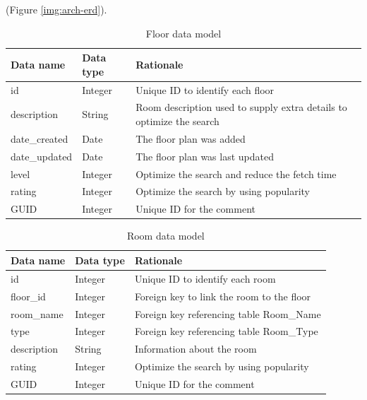 \documentclass{sig-alt-release2}
\begin{document}
 (Figure \ref{img:arch-erd}).




\begin{table}
\begin{tabular}{| p{2cm} | p{2cm} | p{3cm}|}
\hline
Data name & Data type & Rationale \\
\hline
id & Integer & Unique ID to identify each floor \\
\hline
description & String & Room description used to supply extra details to optimize the search\\
\hline
date\_created & Date & The floor plan was added\\
\hline
date\_updated & Date & The floor plan was last updated\\
\hline
level & Integer & Optimize the search and reduce the fetch time\\
\hline
rating & Integer & Optimize the search by using popularity\\
\hline
GUID & Integer & Unique ID for the comment\\
\hline
\end{tabular}	
\caption{Floor data model}
\end{table}



\begin{table}
\begin{tabular}{| p{2cm} | p{2cm} | p{3cm}|}
\hline
Data name & Data type & Rationale \\
\hline
id & Integer & Unique ID to identify each room \\
\hline
floor\_id & Integer & Foreign key to link the room to the floor\\
\hline
room\_name & Integer & Foreign key referencing table Room\_Name\\
\hline
type & Integer & Foreign key referencing table Room\_Type \\
\hline
description & String & Information about the room\\
\hline
rating & Integer & Optimize the search by using popularity\\
\hline
GUID & Integer & Unique ID for the comment\\
\hline
\end{tabular}	
\caption{Room data model}
\end{table}
\end{document}
